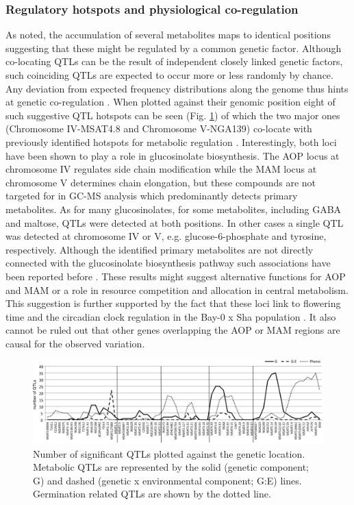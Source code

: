\subsubsection{Regulatory hotspots and physiological co-regulation}
As noted, the accumulation of several metabolites maps to identical positions suggesting that these might 
be regulated by a common genetic factor. Although co-locating QTLs can be the result of independent closely 
linked genetic factors, such coinciding QTLs are expected to occur more or less randomly by chance. Any 
deviation from expected frequency distributions along the genome thus hints at genetic co-regulation 
\cite{Breitling:2008a}. When plotted against their genomic position eight of such suggestive QTL hotspots 
can be seen (Fig. \ref{fig:nQTL}) of which the two major ones (Chromosome IV-MSAT4.8 and Chromosome V-NGA139) co-locate 
with previously identified hotspots for metabolic regulation \cite{Kliebenstein:2001, Keurentjes:2006, 
Wentzell:2007, Rowe:2008}.  Interestingly, both loci have been shown to play a role in glucosinolate 
biosynthesis. The AOP locus at chromosome IV regulates side chain modification while the 
MAM locus at chromosome V determines chain elongation, but these compounds are not targeted for in GC-MS 
analysis which predominantly detects primary metabolites. As for many glucosinolates, for some metabolites, 
including GABA and maltose, QTLs were detected at both positions. In other cases a single QTL was detected 
at chromosome IV or V, e.g. glucose-6-phosphate and tyrosine, respectively. Although the identified  primary 
metabolites are not directly connected with the glucosinolate biosynthesis pathway such associations have 
been reported before \cite{Rowe:2008}. These results might suggest alternative functions for AOP and MAM 
or a role in resource competition and allocation in central metabolism. This suggestion is further supported 
by the fact that these loci link to flowering time and the circadian clock regulation in the Bay-0 x Sha 
population \cite{Chan:2011}. It also cannot be ruled out that other genes overlapping the AOP or MAM 
regions are causal for the observed variation.

\begin{figure}[h!]
  \centering
  \includegraphics[keepaspectratio,scale=0.30]{eps/image_3_2_5.eps}
  \caption[Number of significant QTL]{Number of significant QTLs plotted against the genetic location. Metabolic 
          QTLs are represented by the solid (genetic component; G) and dashed (genetic x environmental component; 
          G:E) lines. Germination related QTLs \cite{Joosen:2011} are shown by the dotted line.}
          \label{fig:nQTL}
\end{figure}


